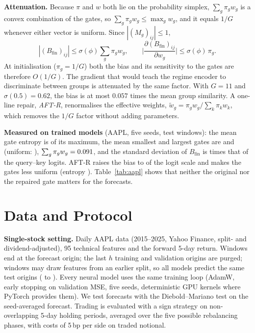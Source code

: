 \textbf{Attenuation.} Because $\pi$ and $w$ both lie on the probability simplex, $\sum_g\pi_g w_g$ is a convex combination of the gates, so $\sum_g\pi_gw_g\le\max_g w_g$, and it equals $1/G$ whenever either vector is uniform. Since $|(M_g)_{ij}|\le1$,
\begin{equation}
|(B_{\mathrm{fin}})_{ij}|\le\sigma(\phi)\textstyle\sum_g\pi_gw_g,\qquad
\Big|\frac{\partial (B_{\mathrm{fin}})_{ij}}{\partial w_g}\Big|\le\sigma(\phi)\,\pi_g .
\label{eq:atten}
\end{equation}
At initialisation ($\pi_g=1/G$) both the bias and its sensitivity to the gates are therefore $O(1/G)$. The gradient that would teach the regime encoder to discriminate between groups is attenuated by the same factor. With $G=11$ and $\sigma(0.5)=0.62$, the bias is at most $0.057$ times the mean group similarity. A one-line repair, \emph{AFT-R}, renormalises the effective weights, $\tilde w_g=\pi_gw_g/\sum_k\pi_kw_k$, which removes the $1/G$ factor without adding parameters.

\textbf{Measured on trained models} (AAPL, five seeds, test windows): the mean gate entropy is \gAftEntropy{} of its maximum, the mean smallest and largest gates are \gAftMinGate{} and \gAftMaxGate{} (uniform: \gUniform), $\sum_g\pi_gw_g=0.091$, and the standard deviation of $B_{\mathrm{fin}}$ is \gAftFinQk{} times that of the query--key logits. AFT-R raises the bias to \gAftrFinQk{} of the logit scale and makes the gates less uniform (entropy \gAftrEntropy). Table~\ref{tab:aapl} shows that neither the original nor the repaired gate matters for the forecasts.

\section{Data and Protocol}
\label{sec:protocol}
\textbf{Single-stock setting.} Daily AAPL data (2015--2025, Yahoo Finance, split- and dividend-adjusted), 95 technical features and the forward 5-day return. Windows end at the forecast origin; the last $h$ training and validation origins are purged; windows may draw features from an earlier split, so all models predict the same \aNTest{} test origins (\aTestStart{} to \aTestEnd). Every neural model uses the same training loop (AdamW, early stopping on validation MSE, five seeds, deterministic GPU kernels where PyTorch provides them). We test forecasts with the Diebold--Mariano test on the seed-averaged forecast. Trading is evaluated with a sign strategy on non-overlapping 5-day holding periods, averaged over the five possible rebalancing phases, with costs of 5\,bp per side on traded notional.

